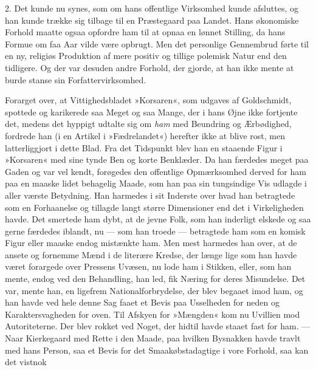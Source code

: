 \documentclass[12pt,a4paper,openany]{book}
\newcommand{\opage}[1]{\marginnote{\footnotesize\textit{[#1]}}}
\begin{document}
2. Det kunde nu synes, som om hans offentlige
Virksomhed kunde afsluttes, og han kunde trække sig
tilbage til en Præstegaard paa Landet. Hans økonomiske
Forhold maatte ogsaa opfordre ham til at opnaa en lønnet
\opage{130}Stilling, da hans Formue om faa Aar vilde være opbrugt.
Men det personlige Gennembrud førte til en ny, religiøs
Produktion af mere positiv og tillige polemisk Natur end
den tidligere. Og der var desuden andre Forhold, der
gjorde, at han ikke mente at burde stanse sin Forfattervirksomhed.

Forarget over, at Vittighedsbladet »Korsaren«, som
udgaves af Goldschmidt, spottede og karikerede saa Meget
og saa Mange, der i hans Øjne ikke fortjente det, medens
det hyppigt udtalte sig om \textit{ham} med Beundring og Ærbødighed,
fordrede han (i en Artikel i »Fædrelandet«)
herefter ikke at blive rost, men latterliggjort i dette
Blad. Fra det Tidspunkt blev han en staaende Figur i
»Korsaren« med sine tynde Ben og korte Benklæder.
Da han færdedes meget paa Gaden og var vel kendt,
forøgedes den offentlige Opmærksomhed derved for ham
paa en maaske lidet behagelig Maade, som han paa sin
tungsindige Vis udlagde i aller værste Betydning. Han
harmedes i sit Inderste over hvad han betragtede som
en Forhaanelse og tillagde langt større Dimensioner end
det i Virkeligheden havde. Det smertede ham dybt, at
de jevne Folk, som han inderligt elskede og saa gerne
færdedes iblandt, nu --- som han troede --- betragtede
ham som en komisk Figur eller maaske endog mistænkte
ham. Men mest harmedes han over, at de ansete og
fornemme Mænd i de literære Kredse, der længe lige
som han havde været forargede over Pressens Uvæsen,
nu lode ham i Stikken, eller, som han mente, endog ved
den Behandling, han led, fik Næring for deres Misundelse.
Det var, mente han, en ligefrem Nationalforbrydelse,
der blev begaaet imod ham, og han havde ved hele
denne Sag faaet et Bevis paa Usselheden for neden og
Karaktersvagheden for oven. Til Afskyen for »Mængden«
kom nu Uvillien mod Autoriteterne. Der blev rokket
\opage{131}ved Noget, der hidtil havde staaet fast for ham. --- Naar
Kierkegaard med Rette i den Maade, paa hvilken Bysnakken
havde travlt med hans Person, saa et Bevis for
det Smaakøbstadagtige i vore Forhold, saa kan det vistnok
\end{document}
